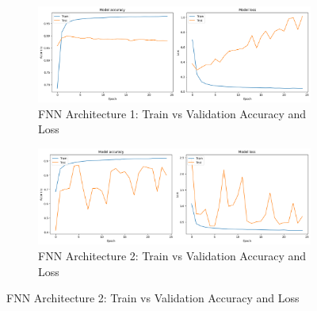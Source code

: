 \begin{figure}[h!]
\centering

\begin{subfigure}[t]{0.48\textwidth}
\centering
\includegraphics[width=\textwidth]{./images/fnn1-acc.png}
\caption{FNN Architecture 1: Train vs Validation Accuracy and Loss}
\label{fig:fnn1_accuracy}
\end{subfigure}

\vspace{0.5cm} %

\begin{subfigure}[t]{0.48\textwidth}
\centering
\includegraphics[width=\textwidth]{./images/fnn2-acc.png}
\caption{FNN Architecture 2: Train vs Validation Accuracy and Loss}
\label{fig:fnn1_loss}
\end{subfigure}

\vspace{0.5cm}


\end{figure}
